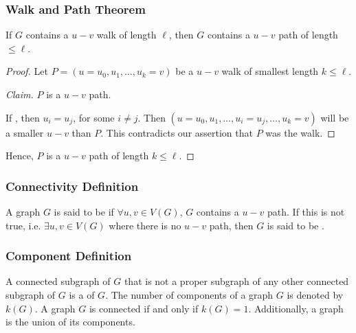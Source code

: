 \subsubsection*{Walk and Path Theorem}
If $G$ contains a $u-v$ walk of length $\ell$, then $G$ contains a $u-v$ path of length $\leq \ell$.
\begin{proof}
    Let $P = (u=u_0, u_1, \ldots, u_k = v)$ be a $u-v$ walk of smallest length $k \leq \ell$.

    \begin{proof}[Claim]
        $P$ is a $u-v$ path.

        If , then $u_i = u_j$, for some $i \neq j$. Then $(u=u_0, u_1, \ldots, u_i = u_j, \ldots, u_k = v)$ will be a smaller $u-v$ than $P$. This contradicts our assertion that $P$ was the  walk.
    \end{proof}

    Hence, $P$ is a $u-v$ path of length $k \leq \ell$.
\end{proof}

\subsubsection*{Connectivity Definition}
A graph $G$ is said to be  if $\forall u,v \in V(G)$, $G$ contains a $u-v$ path. If this is not true, i.e. $\exists u,v \in V(G)$ where there is no $u-v$ path, then $G$ is said to be .

\subsubsection*{Component Definition}
A connected subgraph of $G$ that is not a proper subgraph of any other connected subgraph of $G$ is a  of $G$. The number of components of a graph $G$ is denoted by $k(G)$. A graph $G$ is connected if and only if $k(G) = 1$. Additionally, a graph is the union of its components.


